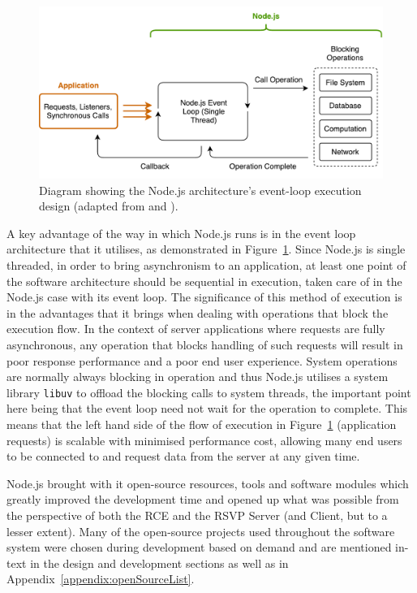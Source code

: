         \begin{figure}[h!]
          \centering
          \includegraphics[width=0.8\linewidth]{figures/softDesign-nodeEventLoop}
          \caption[Diagram showing the Node.js architecture's event-loop execution design.]{Diagram showing the Node.js architecture's event-loop execution design (adapted from \cite{fig:softDesign-nodeEventLoop_cite1} and \cite{fig:softDesign-nodeEventLoop_cite2}).}
          \label{fig:softDesign-nodeEventLoop}
        \end{figure}
        
        A key advantage of the way in which Node.js runs is in the event loop architecture that it utilises, as demonstrated in Figure~\ref{fig:softDesign-nodeEventLoop}. Since Node.js is single threaded, in order to bring asynchronism to an application, at least one point of the software architecture should be sequential in execution, taken care of in the Node.js case with its event loop. The significance of this method of execution is in the advantages that it brings when dealing with operations that block the execution flow. In the context of server applications where requests are fully asynchronous, any operation that blocks handling of such requests will result in poor response performance and a poor end user experience. System operations are normally always blocking in operation and thus Node.js utilises a system library \texttt{libuv} to offload the blocking calls to system threads, the important point here being that the event loop need not wait for the operation to complete. This means that the left hand side of the flow of execution in Figure~\ref{fig:softDesign-nodeEventLoop} (application requests) is scalable with minimised performance cost, allowing many end users to be connected to and request data from the server at any given time.
        
        Node.js brought with it open-source resources, tools and software modules which greatly improved the development time and opened up what was possible from the perspective of both the RCE and the RSVP Server (and Client, but to a lesser extent). Many of the open-source projects used throughout the software system were chosen during development based on demand and are mentioned in-text in the design and development sections as well as in Appendix~\ref{appendix:openSourceList}. %
        
